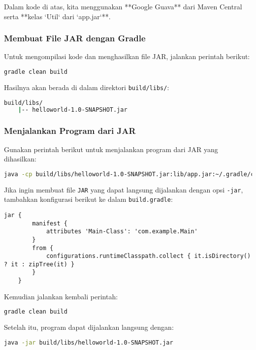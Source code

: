 Dalam kode di atas, kita menggunakan **Google Guava** dari Maven Central serta **kelas `Util` dari `app.jar`**.

\subsubsection{Membuat File JAR dengan Gradle}
Untuk mengompilasi kode dan menghasilkan file JAR, jalankan perintah berikut:

\begin{lstlisting}[language=bash]
	gradle clean build
\end{lstlisting}

Hasilnya akan berada di dalam direktori \texttt{build/libs/}:

\begin{lstlisting}[language=bash]
	build/libs/
	|-- helloworld-1.0-SNAPSHOT.jar
\end{lstlisting}

\subsubsection{Menjalankan Program dari JAR}
Gunakan perintah berikut untuk menjalankan program dari JAR yang dihasilkan:

\begin{lstlisting}[language=bash]
	java -cp build/libs/helloworld-1.0-SNAPSHOT.jar:lib/app.jar:~/.gradle/caches/modules-2/files-2.1/com.google.guava/guava/31.1-jre com.example.Main
\end{lstlisting}

Jika ingin membuat file \texttt{JAR} yang dapat langsung dijalankan dengan opsi \texttt{-jar}, tambahkan konfigurasi berikut ke dalam \texttt{build.gradle}:

\begin{lstlisting}[style=XmlStyle]
	jar {
		manifest {
			attributes 'Main-Class': 'com.example.Main'
		}
		from {
			configurations.runtimeClasspath.collect { it.isDirectory() ? it : zipTree(it) }
		}
	}
\end{lstlisting}

Kemudian jalankan kembali perintah:

\begin{lstlisting}[language=bash]
	gradle clean build
\end{lstlisting}

Setelah itu, program dapat dijalankan langsung dengan:

\begin{lstlisting}[language=bash]
	java -jar build/libs/helloworld-1.0-SNAPSHOT.jar
\end{lstlisting}

